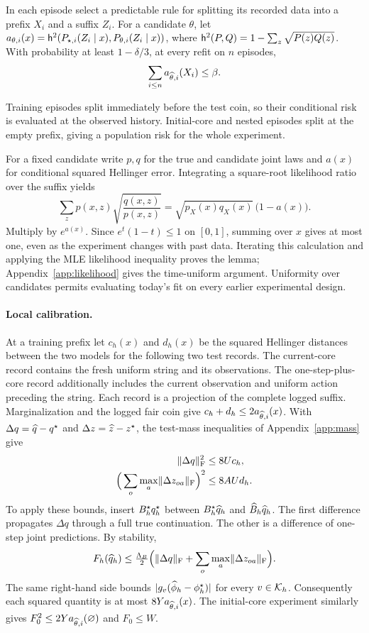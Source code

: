 \begin{lemma}\label{lem:mle}
In each episode select a predictable rule for splitting its recorded data into a prefix $X_i$ and a suffix $Z_i$. For a candidate $\theta$, let $a_{\theta,i}(x)=\mathsf h^2(P_{\star,i}(Z_i\mid x),P_{\theta,i}(Z_i\mid x))$, where $\mathsf h^2(P,Q)=1-\sum_z\sqrt{P(z)Q(z)}$. With probability at least $1-\delta/3$, at every refit on $n$ episodes,
\[
 \sum_{i\le n} a_{\widehat\theta,i}(X_i)\le\beta .
\]
\end{lemma}
Training episodes split immediately before the test coin, so their conditional risk is evaluated at the observed history. Initial-core and nested episodes split at the empty prefix, giving a population risk for the whole experiment.

For a fixed candidate write $p,q$ for the true and candidate joint laws and $a(x)$ for conditional squared Hellinger error. Integrating a square-root likelihood ratio over the suffix yields
\[
 \sum_z p(x,z)\sqrt{\frac{q(x,z)}{p(x,z)}}
   =\sqrt{p_X(x)q_X(x)}\,\bigl(1-a(x)\bigr).
\]
Multiply by $e^{a(x)}$. Since $e^t(1-t)\le1$ on $[0,1]$, summing over $x$ gives at most one, even as the experiment changes with past data. Iterating this calculation and applying the MLE likelihood inequality proves the lemma; Appendix~\ref{app:likelihood} gives the time-uniform argument. Uniformity over candidates permits evaluating today's fit on every earlier experimental design.

\paragraph{Local calibration.}
At a training prefix let $c_h(x)$ and $d_h(x)$ be the squared Hellinger distances between the two models for the following two test records. The current-core record contains the fresh uniform string and its observations. The one-step-plus-core record additionally includes the current observation and uniform action preceding the string. Each record is a projection of the complete logged suffix. Marginalization and the logged fair coin give $c_h+d_h\le2a_{\widehat\theta,i}(x)$. With $\Delta q=\widehat q-q^\star$ and $\Delta z=\widehat z-z^\star$, the test-mass inequalities of Appendix~\ref{app:mass} give
\begin{align}
 \lVert \Delta q\rVert_{\mathrm F}^2&\le 8U c_h,\nonumber\\[-1pt]
 \Big(\sum_o\max_a\lVert \Delta z_{oa}\rVert_{\mathrm F}\Big)^2&\le 8AU d_h.
 \label{eq:drift}
\end{align}
To apply these bounds, insert $B_h^\star q_h^\star$ between $B_h^\star\widehat q_h$ and $\widehat B_h\widehat q_h$. The first difference propagates $\Delta q$ through a full true continuation. The other is a difference of one-step joint predictions. By stability,
\[
 F_h(\widehat q_h)
 \le \tfrac{\Lambda_B}{2}\Big(\lVert \Delta q\rVert_{\mathrm F}+
             \sum_o\max_a\lVert \Delta z_{oa}\rVert_{\mathrm F}\Big).
\]
The same right-hand side bounds $|g_v(\widehat\phi_h-\phi_h^\star)|$ for every $v\in\mathcal K_h$. Consequently each squared quantity is at most $8Y a_{\widehat\theta,i}(x)$. The initial-core experiment similarly gives $F_0^2\le2Y a_{\widehat\theta,i}(\varnothing)$ and $F_0\le W$.

